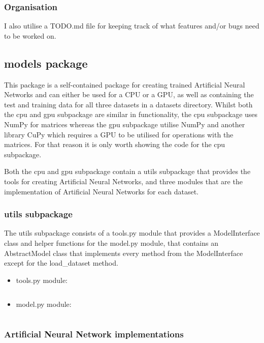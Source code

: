 \documentclass[./project-report/src/latex/project-report.tex]{subfiles}
\begin{document}
\subsubsection{Organisation}

I also utilise a TODO.md file for keeping track of what features and/or bugs need to be worked on.

\subsection{models package}

This package is a self-contained package for creating trained Artificial Neural Networks and can either be used for a CPU or a GPU, as well as containing the test 
and training data for all three datasets in a datasets directory. Whilst both the cpu and gpu subpackage are similar in functionality, the cpu subpackage uses NumPy 
for matrices whereas the gpu subpackage utilise NumPy and another library CuPy which requires a GPU to be utilised for operations with the matrices. For that reason 
it is only worth showing the code for the cpu subpackage.

Both the cpu and gpu subpackage contain a utils subpackage that provides the tools for creating Artificial Neural Networks, and three modules that are the implementation 
of Artificial Neural Networks for each dataset.

\subsubsection{utils subpackage}

The utils subpackage consists of a tools.py module that provides a ModelInterface class and helper functions for the model.py module, that contains an AbstractModel 
class that implements every method from the ModelInterface except for the load\_dataset method.

\begin{itemize}
    \item tools.py module:
        \inputminted{python}{./school_project/models/cpu/utils/tools.py}
    \item model.py module:
        \inputminted{python}{./school_project/models/cpu/utils/model.py}
\end{itemize}

\subsubsection{Artificial Neural Network implementations}
\end{document}
